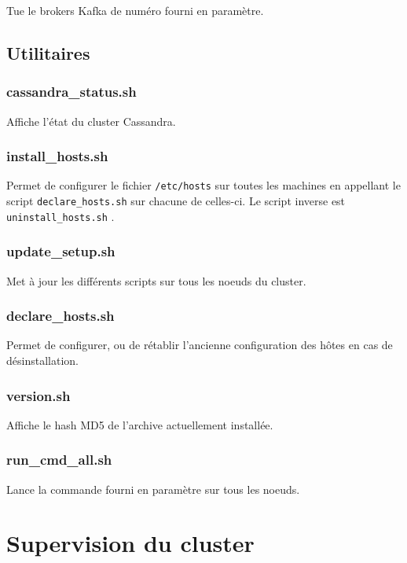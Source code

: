 \documentclass[a4paper, 11pt, titlepage]{article}
\begin{document}
Tue le brokers Kafka de numéro fourni en paramètre.



\subsection {Utilitaires}

\subsubsection*{cassandra\_status.sh}

Affiche l'état du cluster Cassandra.


\subsubsection*{install\_hosts.sh}
Permet de configurer le fichier \lstinline!/etc/hosts! sur toutes les machines en appellant le script \lstinline!declare_hosts.sh! sur chacune de celles-ci.
Le script inverse est \lstinline!uninstall_hosts.sh! .


\subsubsection*{update\_setup.sh}

Met à jour les différents scripts sur tous les noeuds du cluster.


\subsubsection*{declare\_hosts.sh}

Permet de configurer, ou de rétablir l'ancienne configuration des hôtes en cas de désinstallation.


\subsubsection*{version.sh}

Affiche le hash MD5 de l'archive actuellement installée.


\subsubsection*{run\_cmd\_all.sh}

Lance la commande fourni en paramètre sur tous les noeuds.



\section {Supervision du cluster}
\end{document}
